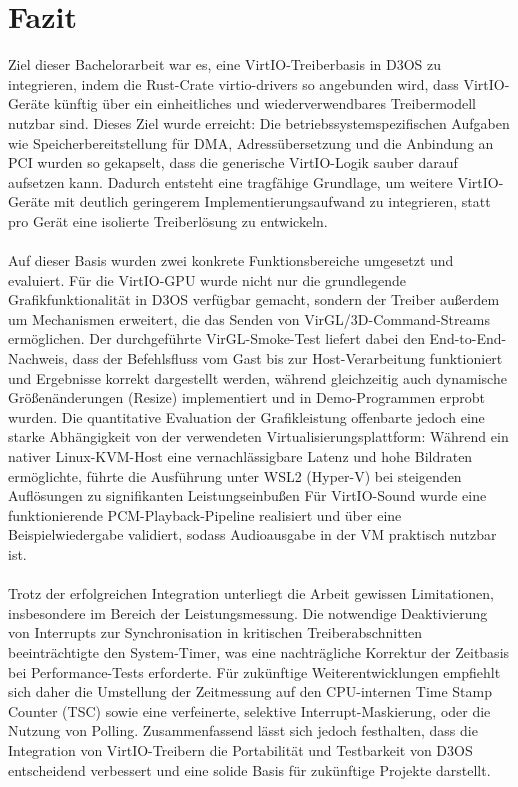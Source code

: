 \chapter{Fazit}

Ziel dieser Bachelorarbeit war es, eine VirtIO-Treiberbasis in D3OS zu integrieren, indem die Rust-Crate virtio-drivers so angebunden wird, dass VirtIO-Geräte künftig über ein einheitliches und wiederverwendbares Treibermodell nutzbar sind. Dieses Ziel wurde erreicht: Die betriebssystemspezifischen Aufgaben wie Speicherbereitstellung für DMA, Adressübersetzung und die Anbindung an PCI wurden so gekapselt, dass die generische VirtIO-Logik sauber darauf aufsetzen kann. Dadurch entsteht eine tragfähige Grundlage, um weitere VirtIO-Geräte mit deutlich geringerem Implementierungsaufwand zu integrieren, statt pro Gerät eine isolierte Treiberlösung zu entwickeln.\\
\\
Auf dieser Basis wurden zwei konkrete Funktionsbereiche umgesetzt und evaluiert. Für die VirtIO-GPU wurde nicht nur die grundlegende Grafikfunktionalität in D3OS verfügbar gemacht, sondern der Treiber außerdem um Mechanismen erweitert, die das Senden von VirGL/3D-Command-Streams ermöglichen. Der durchgeführte VirGL-Smoke-Test liefert dabei den End-to-End-Nachweis, dass der Befehlsfluss vom Gast bis zur Host-Verarbeitung funktioniert und Ergebnisse korrekt dargestellt werden, während gleichzeitig auch dynamische Größenänderungen (Resize) implementiert und in Demo-Programmen erprobt wurden. Die quantitative Evaluation der Grafikleistung offenbarte jedoch eine starke Abhängigkeit von der verwendeten Virtualisierungsplattform: Während ein nativer Linux-KVM-Host eine vernachlässigbare Latenz und hohe Bildraten ermöglichte, führte die Ausführung unter WSL2 (Hyper-V) bei steigenden Auflösungen zu signifikanten Leistungseinbußen Für VirtIO-Sound wurde eine funktionierende PCM-Playback-Pipeline realisiert und über eine Beispielwiedergabe validiert, sodass Audioausgabe in der VM praktisch nutzbar ist.\\
\\
Trotz der erfolgreichen Integration unterliegt die Arbeit gewissen Limitationen, insbesondere im Bereich der Leistungsmessung. Die notwendige Deaktivierung von Interrupts zur Synchronisation in kritischen Treiberabschnitten beeinträchtigte den System-Timer, was eine nachträgliche Korrektur der Zeitbasis bei Performance-Tests erforderte. Für zukünftige Weiterentwicklungen empfiehlt sich daher die Umstellung der Zeitmessung auf den CPU-internen Time Stamp Counter (TSC) sowie eine verfeinerte, selektive Interrupt-Maskierung, oder die Nutzung von Polling. Zusammenfassend lässt sich jedoch festhalten, dass die Integration von VirtIO-Treibern die Portabilität und Testbarkeit von D3OS entscheidend verbessert und eine solide Basis für zukünftige Projekte darstellt.